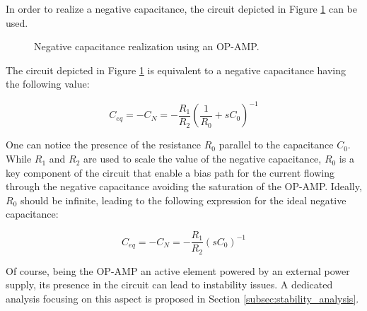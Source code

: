 In order to realize a negative capacitance, the circuit depicted in Figure \ref{fig:negative_capacitance_realization} can be used.

\begin{figure}[H]
    \centering
    \caption{Negative capacitance realization using an OP-AMP.}
    \label{fig:negative_capacitance_realization}

\end{figure}

The circuit depicted in Figure \ref{fig:negative_capacitance_realization} is equivalent to a negative capacitance having the following value:

\begin{equation}
    C_{eq} = -C_N = -\frac{R_1}{R_2} \left(\frac{1}{R_0} + sC_0\right)^{-1}
    \label{eq:negative_capacitance_real}
\end{equation}

One can notice the presence of the resistance $R_0$ parallel to the capacitance $C_0$.
While $R_1$ and $R_2$ are used to scale the value of the negative capacitance, $R_0$ is a key component of the circuit that enable a bias path for the current flowing through the negative capacitance avoiding the saturation of the OP-AMP.
Ideally, $R_0$ should be infinite, leading to the following expression for the ideal negative capacitance:

\begin{equation}
    C_{eq} = -C_N = -\frac{R_1}{R_2} \left(sC_0\right)^{-1}
    \label{eq:negative_capacitance_ideal}
\end{equation}

Of course, being the OP-AMP an active element powered by an external power supply, its presence in the circuit can lead to instability issues.
A dedicated analysis focusing on this aspect is proposed in Section \ref{subsec:stability_analysis}.




